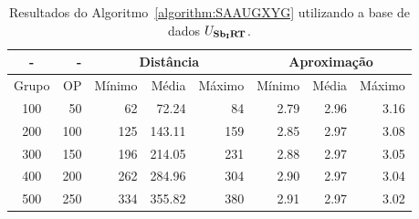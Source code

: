 \begin{table}[!htb]
  \caption{Resultados do Algoritmo~\ref{algorithm:SAAUGXYG} utilizando a base de dados $U_{\textbf{Sb\textsubscript{I}RT}}{}$.}
  \label{table:WFTACOYR}
  \centering
  \begin{tabular}{|c|r|r|r|r|r|r|r|}
    \hline
      -      &  -   & \multicolumn{3}{c|}{Distância}             & \multicolumn{3}{c|}{Aproximação}           \\ \hline
    Grupo    & OP   & Mínimo       & Média        & Máximo       & Mínimo       & Média        & Máximo       \\ \hline  
    100      & 50   & 62           &  72.24       & 84           & 2.79         & 2.96         & 3.16         \\ \hline
    200      & 100  & 125          & 143.11       & 159          & 2.85         & 2.97         & 3.08         \\ \hline
    300      & 150  & 196          & 214.05       & 231          & 2.88         & 2.97         & 3.05         \\ \hline
    400      & 200  & 262          & 284.96       & 304          & 2.90         & 2.97         & 3.04         \\ \hline
    500      & 250  & 334          & 355.82       & 380          & 2.91         & 2.97         & 3.02         \\ \hline    
  \end{tabular}
\end{table}